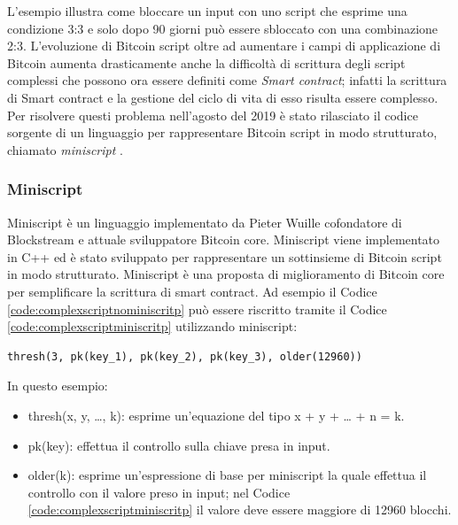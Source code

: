 

L’esempio illustra come bloccare un input con uno script che esprime una condizione 3:3 e solo dopo 90 giorni può essere sbloccato con una combinazione 2:3.
L’evoluzione di Bitcoin script oltre ad aumentare i campi di applicazione di Bitcoin aumenta drasticamente anche la difficoltà di scrittura degli script complessi che possono ora essere definiti come {\it Smart contract\/}; infatti la scrittura di Smart contract e la gestione del ciclo di vita di esso risulta essere complesso.
Per risolvere questi problema nell'agosto del 2019 è stato rilasciato il codice sorgente di un linguaggio per rappresentare Bitcoin script in modo strutturato, chiamato {\it miniscript \/}.

\subsubsection{Miniscript}

Miniscript è un linguaggio implementato da Pieter Wuille cofondatore di Blockstream e attuale sviluppatore Bitcoin core.
Miniscript viene implementato in C++ ed è stato sviluppato per rappresentare un sottinsieme di Bitcoin script in modo strutturato.
Miniscript è una proposta di miglioramento di Bitcoin core per semplificare la scrittura di smart contract. Ad esempio il Codice \ref{code:complexscriptnominiscritp} può essere riscritto tramite il Codice \ref{code:complexscriptminiscritp} utilizzando miniscript:

\begin{lstlisting}[language=miniscript, label={code:complexscriptminiscritp}, caption={Rappresenta un esempio di utilizzo di miniscript.}]
thresh(3, pk(key_1), pk(key_2), pk(key_3), older(12960))
\end{lstlisting}

In questo esempio:
\begin{itemize}
  \item thresh(x, y, …, k): esprime un'equazione del tipo x + y + … + n = k.
  \item pk(key): effettua il controllo sulla chiave presa in input.
  \item older(k): esprime un'espressione di base per miniscript la quale effettua il controllo con il valore preso in input; nel Codice \ref{code:complexscriptminiscritp} il valore deve essere maggiore di 12960 blocchi.
\end{itemize}
